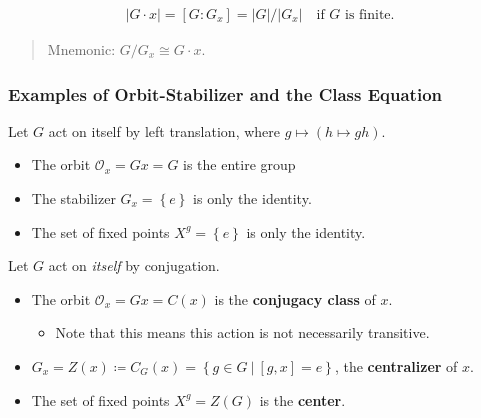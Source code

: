 \begin{theorem}

\begin{align*}{\left\lvert {G\cdot x} \right\rvert} = [G: G_x] = {\left\lvert {G} \right\rvert} / {\left\lvert {G_x} \right\rvert}\quad \text{if $G$ is finite}
.\end{align*}

\begin{quote}
Mnemonic: \(G/G_x \cong G\cdot x\).
\end{quote}

\end{theorem}

\hypertarget{examples-of-orbit-stabilizer-and-the-class-equation}{%
\subsubsection{Examples of Orbit-Stabilizer and the Class
Equation}\label{examples-of-orbit-stabilizer-and-the-class-equation}}

\begin{example}[Trivial]

Let \(G\) act on itself by left translation, where
\(g \mapsto (h\mapsto gh)\).

\begin{itemize}
\item
  The orbit \({\mathcal{O}}_x = Gx = G\) is the entire group
\item
  The stabilizer \(G_x = \left\{{ e }\right\}\) is only the identity.
\item
  The set of fixed points \(X^g = \left\{{ e }\right\}\) is only the
  identity.
\end{itemize}

\end{example}

\begin{example}

Let \(G\) act on \emph{itself} by conjugation.

\begin{itemize}
\item
  The orbit \({\mathcal{O}}_x = Gx = C(x)\) is the \textbf{conjugacy
  class} of \(x\).

  \begin{itemize}
  \tightlist
  \item
    Note that this means this action is not necessarily transitive.
  \end{itemize}
\item
  \(G_x = Z(x) \coloneqq C_G(x) = \left\{{g \in G{~\mathrel{\Big|}~}[g, x] = e}\right\}\),
  the \textbf{centralizer} of \(x\).
\item
  The set of fixed points \(X^g = Z(G)\) is the \textbf{center}.
\end{itemize}

\end{example}

